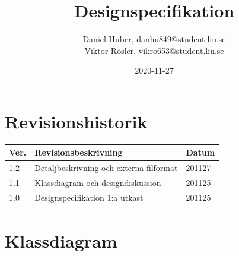 \documentclass{TDP005mall}
\author{Daniel Huber, \url{danhu849@student.liu.se}\\
  Viktor Rösler, \url{vikro653@student.liu.se}}
\title{Designspecifikation}
\date{2020-11-27}
\begin{document}
\projectpage
\tableofcontents
\newpage
\section{Revisionshistorik}
\begin{table}[!h]
\begin{tabularx}{\linewidth}{|l|X|l|}
\hline
Ver. & Revisionsbeskrivning & Datum \\\hline
1.2 & Detaljbeskrivning och externa filformat & 201127 \\\hline
1.1 & Klassdiagram och designdiskussion & 201125 \\\hline
1.0 & Designspecifikation 1:a utkast & 201125 \\\hline
\end{tabularx}
\end{table}



\section{Klassdiagram}
\end{document}
